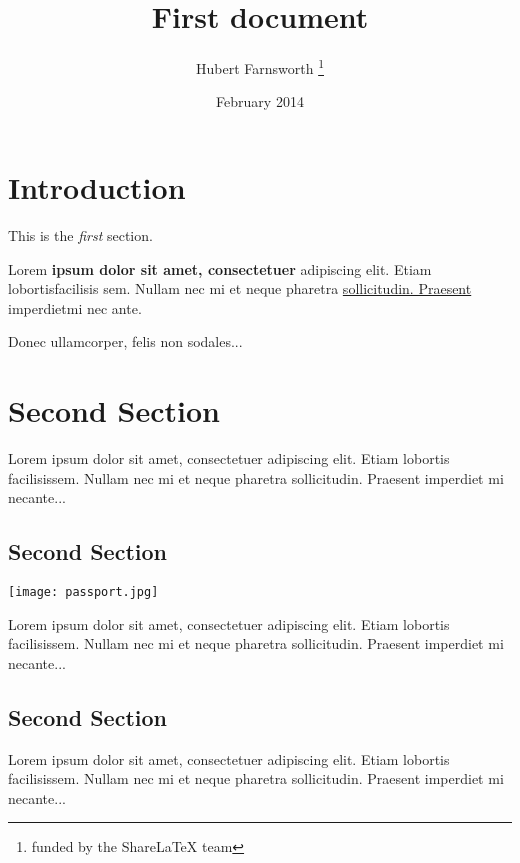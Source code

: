 \documentclass[12pt, letterpaper, twoside]{article}
\title{First document}
\author{Hubert Farnsworth \thanks{funded by the ShareLaTeX team}}
\date{February 2014}
\begin{document}
\section{Introduction}

This is the \textit{first} section.

Lorem  \textbf{ipsum  dolor  sit  amet,  consectetuer}  adipiscing
elit.   Etiam  lobortisfacilisis sem.  Nullam nec mi et
neque pharetra \underline{sollicitudin.  Praesent} imperdietmi nec ante. \par
Donec ullamcorper, felis non sodales...

\section{Second Section}

Lorem ipsum dolor sit amet, consectetuer adipiscing elit.
Etiam lobortis facilisissem.  Nullam nec mi et neque pharetra
sollicitudin.  Praesent imperdiet mi necante...


\subsection{Second Section}

\texttt{[image: passport.jpg]}

Lorem ipsum dolor sit amet, consectetuer adipiscing elit.
Etiam lobortis facilisissem.  Nullam nec mi et neque pharetra
sollicitudin.  Praesent imperdiet mi necante...

\subsection{Second Section}

Lorem ipsum dolor sit amet, consectetuer adipiscing elit.
Etiam lobortis facilisissem.  Nullam nec mi et neque pharetra
sollicitudin.  Praesent imperdiet mi necante...
\end{document}
